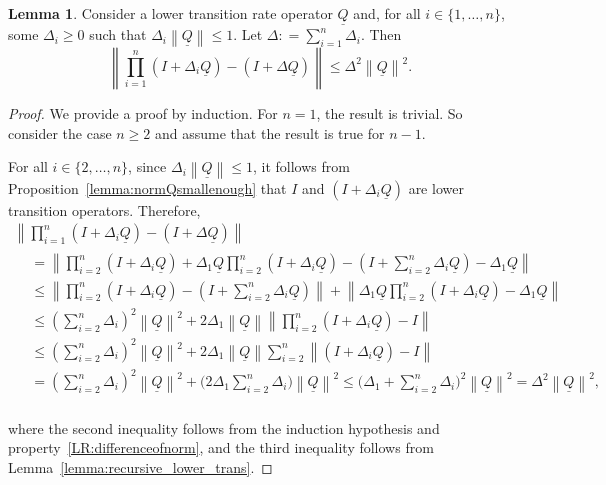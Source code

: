 \documentclass[10pt,a4paper]{paper}
\theoremstyle{definition}
\newtheorem{lemma}[theorem]{Lemma}
\newcommand{\lrate}{\underline{Q}}
\newcommand{\norm}[1]{\left\lVert #1 \right\rVert}
\newcommand{\coloneqq}{:\!=}
\begin{document}
\begin{lemma}\label{lemma:justthelinearpart}
Consider a lower transition rate operator $\lrate$ and, for all $i\in\{1,\ldots,n\}$, some $\Delta_i\geq0$ such that $\Delta_i\norm{\lrate}\leq1$. Let $\Delta\coloneqq\sum_{i=1}^n\Delta_i$. Then
\begin{equation*}
\norm{\prod_{i=1}^n(I+\Delta_i\lrate)-(I+\Delta\lrate)}\leq\Delta^2\norm{\lrate}^2.
\end{equation*}
\end{lemma}
\begin{proof}
We provide a proof by induction. For $n=1$, the result is trivial. So consider the case $n\geq2$ and assume that the result is true for $n-1$. 

For all $i\in\{2,\dots,n\}$, since $\Delta_i\norm{\lrate}\leq1$, it follows from Proposition~\ref{lemma:normQsmallenough} that $I$ and $(I+\Delta_i\lrate)$ are lower transition operators. Therefore,
\begin{multline*}
\norm{\prod_{i=1}^n(I+\Delta_i\lrate)-(I+\Delta\lrate)}\\
\begin{aligned}
&=\norm{\prod_{i=2}^n(I+\Delta_i\lrate)+\Delta_1\lrate\prod_{i=2}^n(I+\Delta_i\lrate)-(I+\sum_{i=2}^n\Delta_i\lrate)-\Delta_1\lrate}\\
&\leq\norm{\prod_{i=2}^n(I+\Delta_i\lrate)-(I+\sum_{i=2}^n\Delta_i\lrate)}+\norm{\Delta_1\lrate\prod_{i=2}^n(I+\Delta_i\lrate)-\Delta_1\lrate}\\
&\leq(\sum_{i=2}^n\Delta_i)^2\norm{\lrate}^2
+2\Delta_1\norm{\lrate}
\norm{\prod_{i=2}^n(I+\Delta_i\lrate)-I}\\
&\leq(\sum_{i=2}^n\Delta_i)^2\norm{\lrate}^2
+2\Delta_1\norm{\lrate}
\sum_{i=2}^n
\norm{(I+\Delta_i\lrate)-I}\\
&=(\sum_{i=2}^n\Delta_i)^2\norm{\lrate}^2
+\Big(2\Delta_1
\sum_{i=2}^n
\Delta_i\Big)\norm{\lrate}^2
\leq\Big(
\Delta_1+\sum_{i=2}^n\Delta_i
\Big)^2\norm{\lrate}^2
=\Delta^2\norm{\lrate}^2,
\end{aligned}
\end{multline*}\\[3pt]
where the second inequality follows from the induction hypothesis and property~\ref{LR:differenceofnorm}, and the third inequality follows from Lemma~\ref{lemma:recursive_lower_trans}.
\end{proof}
\end{document}
